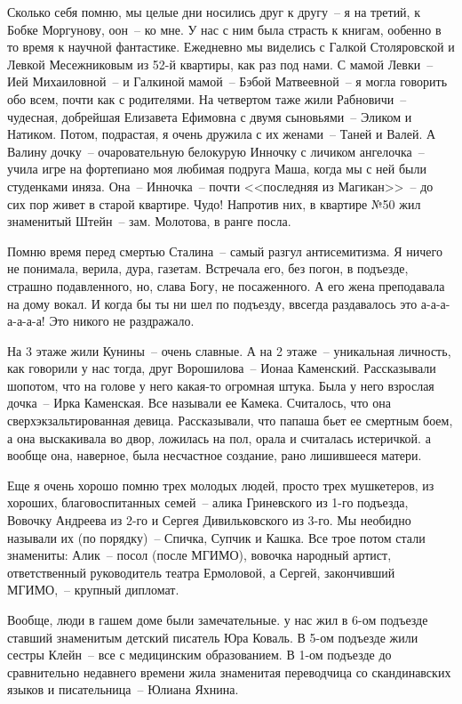 Сколько себя помню, мы целые дни носились друг к другу~-- я на третий, к Бобке Моргунову, оон~-- ко мне. У нас с ним была страсть к книгам, ообенно в то время к научной фантастике. Ежедневно мы виделись с Галкой Столяровской и Левкой Месежниковым из 52-й квартиры, как раз под нами. С мамой Левки~-- Ией Михаиловной~-- и Галкиной мамой~-- Бэбой Матвеевной~-- я могла говорить обо всем, почти как с родителями. На четвертом таже жили Рабновичи~-- чудесная, добрейшая Елизавета Ефимовна с двумя сыновьями~-- Эликом и Натиком. Потом, подрастая, я очень дружила с их женами~-- Таней и Валей. А Валину дочку~-- очаровательную белокурую Инночку с личиком ангелочка~-- учила игре на фортепиано моя любимая подруга Маша, когда  мы с ней были студенками иняза. Она~-- Инночка~-- почти <<последняя из Магикан>>~-- до сих пор живет в старой квартире. Чудо! Напротив них, в квартире №50 жил знаменитый Штейн~-- зам. Молотова, в ранге посла.

Помню время перед смертью Сталина~-- самый разгул антисемитизма. Я ничего не понимала, верила, дура, газетам. Встречала его, без погон, в подъезде, страшно подавленного, но, слава Богу, не посаженного. А его жена преподавала на дому вокал. И когда бы ты ни шел по подъезду, ввсегда раздавалось это а-а-а-а-а-а-а! Это никого не раздражало.

На 3 этаже жили Кунины~-- очень славные. А на 2 этаже~-- уникальная личность, как говорили у нас тогда, друг Ворошилова~-- Ионаа Каменский. Рассказывали шопотом, что на голове у него какая-то огромная штука. Была у него взрослая дочка~-- Ирка Каменская. Все называли ее Камека. Считалось, что она сверхэкзальтированная девица. Рассказывали, что папаша бьет ее смертным боем, а она выскакивала во двор, ложилась на пол, орала и считалась истеричкой. а вообще она, наверное, была несчастное создание, рано лишившееся матери.

Еще я очень хорошо помню трех молодых людей, просто трех мушкетеров, из хороших, благовоспитанных семей~-- алика Гриневского из 1-го подъезда, Вовочку Андреева из 2-го и Сергея Дивильковского из 3-го. Мы необидно называли их (по порядку)~-- Спичка, Супчик и Кашка. Все трое потом стали знамениты: Алик~-- посол (после МГИМО), вовочка народный артист, ответственный руководитель театра Ермоловой, а Сергей, закончивший МГИМО,~-- крупный дипломат.

Вообще, люди в гашем доме были замечательные. у нас жил в 6-ом подъезде ставший знаменитым детский писатель Юра Коваль. В 5-ом подъезде жили сестры Клейн~-- все с медицинским образованием. В 1-ом подъезде до сравнительно недавнего времени жила знаменитая переводчица со скандинавских языков и писательница~-- Юлиана Яхнина.

